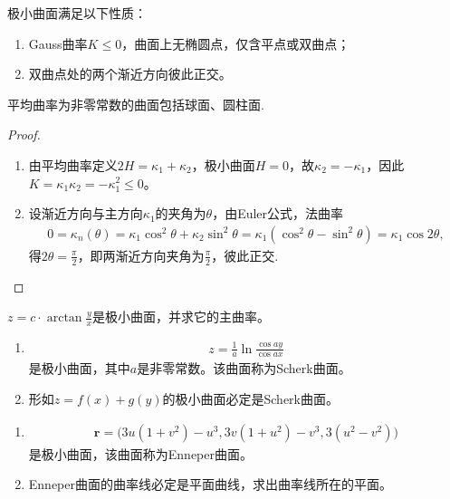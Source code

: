 \documentclass[../../main.tex]{subfiles}%
\begin{document}
\begin{theorem}
极小曲面满足以下性质：
\begin{enumerate}[(1)]
\item Gauss曲率$K\leqslant0$，曲面上无椭圆点，仅含平点或双曲点；
\item 双曲点处的两个渐近方向彼此正交。
\end{enumerate}
\end{theorem}
\begin{remark}
平均曲率为非零常数的曲面包括球面、圆柱面.
\end{remark}
\begin{proof}
\begin{enumerate}[(1)]
\item 由平均曲率定义$2H=\kappa_1+\kappa_2$，极小曲面$H=0$，故$\kappa_2=-\kappa_1$，因此$K=\kappa_1\kappa_2=-\kappa_1^2\leqslant0$。

\item 设渐近方向与主方向$\kappa_1$的夹角为$\theta$，由Euler公式，法曲率
\begin{align*}
0=\kappa_n(\theta)=\kappa_1\cos^2\theta+\kappa_2\sin^2\theta=\kappa_1(\cos^2\theta-\sin^2\theta)=\kappa_1\cos2\theta,
\end{align*}
得$2\theta=\frac{\pi}{2}$，即两渐近方向夹角为$\frac{\pi}{2}$，彼此正交.
\end{enumerate}
\end{proof}

\begin{example}
$z = c \cdot \arctan \frac{y}{x}$是极小曲面，并求它的主曲率。
\end{example}

\begin{example}
\begin{enumerate}[(1)]
\item \begin{align*}
z = \frac{1}{a}\ln\frac{\cos ay}{\cos ax}
\end{align*}
是极小曲面，其中$a$是非零常数。该曲面称为Scherk曲面。

\item 形如$z = f(x) + g(y)$的极小曲面必定是Scherk曲面。
\end{enumerate}
\end{example}

\begin{example}
\begin{enumerate}[(1)]
\item \begin{align*}
\bm{r} = \big(3u(1+v^{2})-u^{3},3v(1+u^{2})-v^{3},3(u^{2}-v^{2})\big)
\end{align*}
是极小曲面，该曲面称为Enneper曲面。

\item Enneper曲面的曲率线必定是平面曲线，求出曲率线所在的平面。
\end{enumerate}
\end{example}
\end{document}
